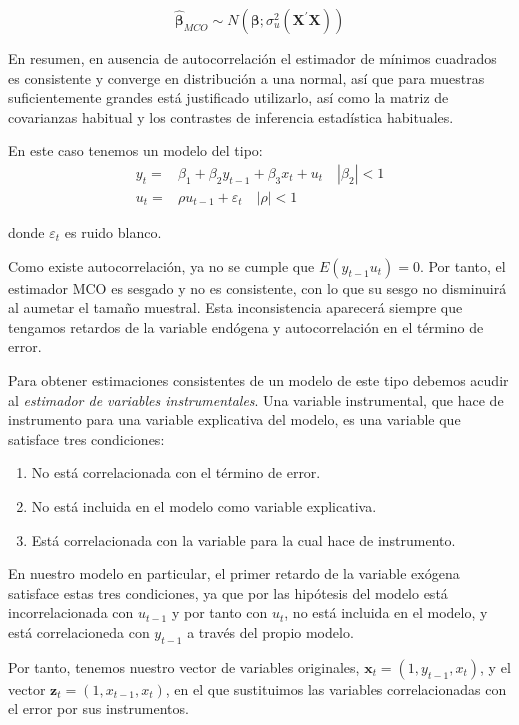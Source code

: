 \[\hat{\boldsymbol{\beta}}_{MCO}\sim N\left(\boldsymbol{\beta};\sigma_u^2\left(\boldsymbol{X}^{\prime}\boldsymbol{X}\right)\right)\]

En resumen, en ausencia de autocorrelaci\'on el estimador de m\'inimos cuadrados es consistente y converge en distribuci\'on a una normal, as\'i que para muestras suficientemente grandes est\'a justificado utilizarlo, as\'i como la matriz de covarianzas habitual y los contrastes de inferencia estad\'istica habituales. 

En este caso tenemos un modelo del tipo:
\begin{align*}
y_t=&\beta_1+\beta_2y_{t-1}+\beta_3x_t+u_t\quad|\beta_2|<1\\
u_t=&\rho u_{t-1}+\varepsilon_t\quad|\rho|<1
\end{align*}

donde $\varepsilon_t$ es ruido blanco.

Como existe autocorrelaci\'on, ya no se cumple que $E(y_{t-1}u_t)=0$. Por tanto, el estimador MCO es sesgado y no es consistente, con lo que su sesgo no disminuir\'a al aumetar el tama\~no muestral. Esta inconsistencia aparecer\'a siempre que tengamos retardos de la variable end\'ogena y autocorrelaci\'on en el t\'ermino de error.

Para obtener estimaciones consistentes de un modelo de este tipo debemos acudir al \textit{estimador de variables instrumentales}. Una variable instrumental, que hace de instrumento para una variable explicativa del modelo, es una variable que satisface tres condiciones:
\begin{enumerate}
\item No est\'a correlacionada con el t\'ermino de error.
\item No est\'a incluida en el modelo como variable explicativa.
\item Est\'a correlacionada con la variable para la cual hace de instrumento.
\end{enumerate}

En nuestro modelo en particular, el primer retardo de la variable ex\'ogena satisface estas tres condiciones, ya que por las hip\'otesis del modelo est\'a incorrelacionada con $u_{t-1}$ y por tanto con $u_t$, no est\'a incluida en el modelo, y est\'a correlacioneda con $y_{t-1}$ a trav\'es del propio modelo.

Por tanto, tenemos nuestro vector de variables originales, $\boldsymbol{x}_t=(1, y_{t-1}, x_t)$, y el vector $\boldsymbol{z}_t=(1, x_{t-1}, x_t)$, en el que sustituimos las variables correlacionadas con el error por sus instrumentos.

